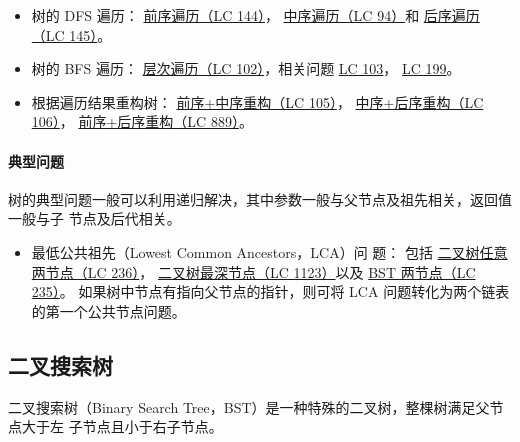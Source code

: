 \begin{itemize}
\item 树的 DFS 遍历：
  \href{https://leetcode.com/problems/binary-tree-preorder-traversal}
  {前序遍历（LC 144）}，
  \href{https://leetcode.com/problems/binary-tree-inorder-traversal}
  {中序遍历（LC 94）}和
  \href{https://leetcode.com/problems/binary-tree-postorder-traversal}
  {后序遍历（LC 145）}。

\item 树的 BFS 遍历：
  \href{https://leetcode.com/problems/binary-tree-postorder-traversal}
  {层次遍历（LC 102）}，相关问题
  \href{https://leetcode.com/problems/binary-tree-zigzag-level-order-traversal}
  {LC 103}，
  \href{https://leetcode.com/problems/binary-tree-right-side-view}
  {LC 199}。

\item 根据遍历结果重构树：
  \href{https://leetcode.com/problems/construct-binary-tree-from-preorder-and-inorder-traversal}
  {前序+中序重构（LC 105）}，
  \href{https://leetcode.com/problems/construct-binary-tree-from-inorder-and-postorder-traversal}
  {中序+后序重构（LC 106）}，
  \href{https://leetcode.com/problems/construct-binary-tree-from-preorder-and-postorder-traversal}
  {前序+后序重构（LC 889）}。
\end{itemize}

\paragraph{典型问题}
树的典型问题一般可以利用递归解决，其中参数一般与父节点及祖先相关，返回值一般与子
节点及后代相关。
\begin{itemize}
\item 最低公共祖先（Lowest Common Ancestors，LCA）问
  题：
  包括
  \href{https://leetcode.com/problems/lowest-common-ancestor-of-a-binary-tree}
  {二叉树任意两节点（LC 236）}，
  \href{https://leetcode.com/problems/lowest-common-ancestor-of-deepest-leaves}
  {二叉树最深节点（LC 1123）}以及
  \href{https://leetcode.com/problems/lowest-common-ancestor-of-a-binary-search-tree}
  {BST 两节点（LC 235）}。
  如果树中节点有指向父节点的指针，则可将 LCA 问题转化为两个链表的第一个公共节点问题。
\end{itemize}

\subsection{二叉搜索树}

二叉搜索树（Binary Search Tree，BST）是一种特殊的二叉树，整棵树满足父节点大于左
子节点且小于右子节点。

